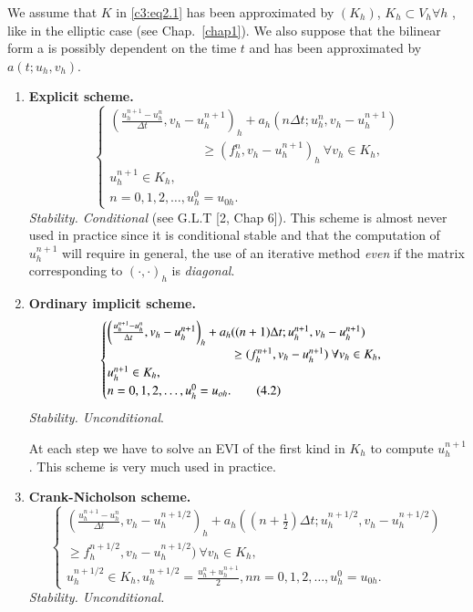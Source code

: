 We assume that $K$ in \eqref{c3:eq2.1} has been approximated by
$(K_h)$, $K_h \subset V_h \forall h$ ,  like in the elliptic case (see
Chap.~\ref{chap1}). We also suppose that the bilinear form a is
possibly dependent on the time $t$ and has been approximated by $a (t
; u_h, v_h)$. 
\begin{enumerate}
\item  {\bf Explicit scheme.}
\begin{equation}
\begin{cases}
  \left(\frac{u^{n+1}_h  -u^n_h} {\Delta  t}, v_h -u^{n+1}_h\right)_h +a_h (n
  \Delta  t; u^n_h, v_h -u^{n+1}_h)\\ 
  \hspace{3cm}\geq (f^n_h, v_h - u^{n+1}_h)_h
  \ \forall v_h \in K_h,\\ 
  u^{n+1}_h \in K_h,\\
  n = 0, 1,2 ,\ldots, u^0_h = u_{0h}. \tag{4.1}\label{c3:eq4.1}
\end{cases}
\end{equation}
\textit{Stability. Conditional} (see G.L.T [2, Chap 6]). This scheme
is almost never used in practice since it is conditional stable and
that the computation of $u_h^{n+1}$ will require in general, the use
of an iterative  method \textit{even} if the matrix corresponding to
$(\cdot , \cdot)_h$ is \textit{diagonal}. 

\item  {\bf Ordinary implicit scheme.}\pageoriginale 
\begin{equation}
\begin{cases}
\left(\frac{u^{n+1}_h -u^n_h} {\Delta  t} , v_h -u^{n+1}_h\right)_h +
a_h ((n+1) \Delta  t ; u^{n+1}_h, v_h - u^{n+1}_h)\\ 
\hspace{3.5cm}\geq (f^{n+1}_h,
v_h - u^{n+1}_h) \ \forall v_h \in K_h, \\ 
u^{n+1}_h \in K_h,\\
n = 0, 1,2 ,\ldots, u^0_h = u_{oh}. \tag{4.2}\label{c3:eq4.2}
\end{cases}
\end{equation}
\textit{Stability. Unconditional}. 

At each step we have to solve an EVI of the first kind in $K_h$ to
compute $u^{n+1}_h$. This scheme is very much used in practice. 

\item  {\bf Crank-Nicholson scheme.}
\begin{equation}
\begin{cases}
(\frac{u^{n+1}_h -u^n_h} {\Delta  t} , v_h -u^{n+1/2}_h)_h + a_h
  ((n+\frac{1}{2}) \Delta  t ; u^{n+1/2}_h, v_h - u^{n+1/2}_h) \\ \geq
  f^{n+1/2}_h, v_h - u^{n+1/2}_h) \ \forall v_h \in K_h,\\ 
  u^{n+1/2}_h \in K_h, u^{n+1/2}_h = \frac{u^n_h + u^{n+1}_h}{2}, n n =
  0,1,2 ,\ldots, u^0_h = u_{0h}. \tag{4.3}\label{c3:eq4.3} 
\end{cases}
\end{equation}
\textit{Stability. Unconditional.}


\end{enumerate}

